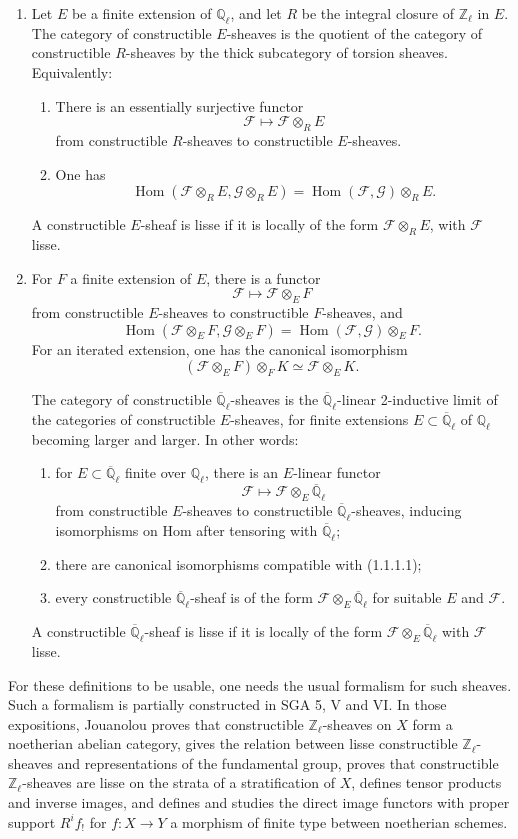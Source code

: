\documentclass[11pt]{article}
\theoremstyle{remark}
\newcommand{\Ql}{\mathbb{Q}_\ell}
\newcommand{\Qlb}{\overline{\mathbb{Q}}_\ell}
\newcommand{\Zl}{\mathbb{Z}_\ell}
\newcommand{\Hom}{\operatorname{Hom}}
\begin{document}
\begin{enumerate}[label=\alph*)]
\item Let $E$ be a finite extension of $\Ql$, and let $R$ be the integral closure of $\Zl$ in $E$. The category of constructible $E$-sheaves is the quotient of the category of constructible $R$-sheaves by the thick subcategory of torsion sheaves. Equivalently:
\begin{enumerate}[label=(\roman*)]
\item There is an essentially surjective functor
\[
\mathcal F\longmapsto \mathcal F\otimes_R E
\]
from constructible $R$-sheaves to constructible $E$-sheaves.
\item One has
\[
\Hom(\mathcal F\otimes_R E,\mathcal G\otimes_R E)
   = \Hom(\mathcal F,\mathcal G)\otimes_R E.
\]
\end{enumerate}
A constructible $E$-sheaf is lisse if it is locally of the form $\mathcal F\otimes_R E$, with $\mathcal F$ lisse.

\item For $F$ a finite extension of $E$, there is a functor
\[
\mathcal F\longmapsto \mathcal F\otimes_E F
\]
from constructible $E$-sheaves to constructible $F$-sheaves, and
\[
\Hom(\mathcal F\otimes_E F,\mathcal G\otimes_E F)
  =\Hom(\mathcal F,\mathcal G)\otimes_E F.
\]
For an iterated extension, one has the canonical isomorphism
\[
(\mathcal F\otimes_E F)\otimes_F K\simeq \mathcal F\otimes_E K. \tag{1.1.1.1}
\]

The category of constructible $\Qlb$-sheaves is the $\Qlb$-linear 2-inductive limit of the categories of constructible $E$-sheaves, for finite extensions $E\subset\Qlb$ of $\Ql$ becoming larger and larger. In other words:
\begin{enumerate}[label=(\roman*)]
\item for $E\subset\Qlb$ finite over $\Ql$, there is an $E$-linear functor
\[
\mathcal F\longmapsto \mathcal F\otimes_E \Qlb
\]
from constructible $E$-sheaves to constructible $\Qlb$-sheaves, inducing isomorphisms on Hom after tensoring with $\Qlb$;
\item there are canonical isomorphisms compatible with (1.1.1.1);
\item every constructible $\Qlb$-sheaf is of the form $\mathcal F\otimes_E\Qlb$ for suitable $E$ and $\mathcal F$.
\end{enumerate}
A constructible $\Qlb$-sheaf is lisse if it is locally of the form $\mathcal F\otimes_E\Qlb$ with $\mathcal F$ lisse.
\end{enumerate}

For these definitions to be usable, one needs the usual formalism for such sheaves. Such a formalism is partially constructed in SGA 5, V and VI. In those expositions, Jouanolou proves that constructible $\Zl$-sheaves on $X$ form a noetherian abelian category, gives the relation between lisse constructible $\Zl$-sheaves and representations of the fundamental group, proves that constructible $\Zl$-sheaves are lisse on the strata of a stratification of $X$, defines tensor products and inverse images, and defines and studies the direct image functors with proper support $R^if_{!}$ for $f:X\to Y$ a morphism of finite type between noetherian schemes.
\end{document}
